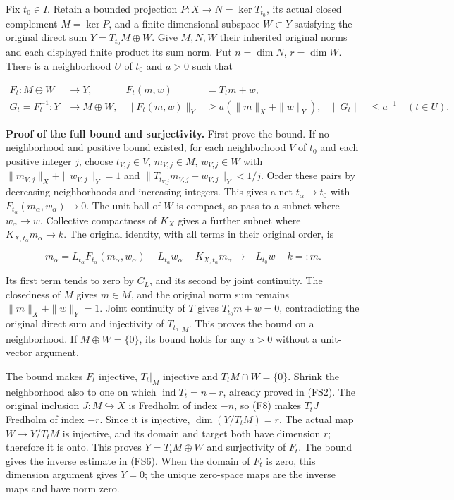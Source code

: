 \documentclass[
  11pt,
]{article}
\begin{document}
Fix \(t_0\in I\). Retain a bounded projection \(P:X\to N=\ker T_{t_0}\),
its actual closed complement \(M=\ker P\), and a finite-dimensional
subspace \(W\subset Y\) satisfying the original direct sum
\(Y=T_{t_0}M\oplus W\). Give \(M,N,W\) their inherited original norms
and each displayed finite product its sum norm. Put \(n=\dim N\),
\(r=\dim W\). There is a neighborhood \(U\) of \(t_0\) and \(a>0\) such
that

\[
 \begin{aligned}
 F_t:M\oplus W&\longrightarrow Y,& F_t(m,w)&=T_tm+w,\\
 G_t=F_t^{-1}:Y&\longrightarrow M\oplus W,&
 \|F_t(m,w)\|_Y&\geq a(\|m\|_X+\|w\|_Y),& \|G_t\|&\leq a^{-1}
 \quad(t\in U).
 \end{aligned}                                                \tag{FS6}
\]

\textbf{Proof of the full bound and surjectivity.} First prove the
bound. If no neighborhood and positive bound existed, for each
neighborhood \(V\) of \(t_0\) and each positive integer \(j\), choose
\(t_{V,j}\in V\), \(m_{V,j}\in M\), \(w_{V,j}\in W\) with
\(\|m_{V,j}\|_X+\|w_{V,j}\|_Y=1\) and
\(\|T_{t_{V,j}}m_{V,j}+w_{V,j}\|_Y<1/j\). Order these pairs by
decreasing neighborhoods and increasing integers. This gives a net
\(t_\alpha\to t_0\) with \(F_{t_\alpha}(m_\alpha,w_\alpha)\to0\). The
unit ball of \(W\) is compact, so pass to a subnet where
\(w_\alpha\to w\). Collective compactness of \(K_X\) gives a further
subnet where \(K_{X,t_\alpha}m_\alpha\to k\). The original identity,
with all terms in their original order, is

\[
 m_\alpha
 =L_{t_\alpha}F_{t_\alpha}(m_\alpha,w_\alpha)
       -L_{t_\alpha}w_\alpha-K_{X,t_\alpha}m_\alpha
 \longrightarrow -L_{t_0}w-k=:m.                             \tag{FS7}
\]

Its first term tends to zero by \(C_L\), and its second by joint
continuity. The closedness of \(M\) gives \(m\in M\), and the original
norm sum remains \(\|m\|_X+\|w\|_Y=1\). Joint continuity of \(T\) gives
\(T_{t_0}m+w=0\), contradicting the original direct sum and injectivity
of \(T_{t_0}|_M\). This proves the bound on a neighborhood. If
\(M\oplus W=\{0\}\), its bound holds for any \(a>0\) without a
unit-vector argument.

The bound makes \(F_t\) injective, \(T_t|_M\) injective and
\(T_tM\cap W=\{0\}\). Shrink the neighborhood also to one on which
\(\operatorname{ind}T_t=n-r\), already proved in (FS2). The original
inclusion \(J:M\hookrightarrow X\) is Fredholm of index \(-n\), so (F8)
makes \(T_tJ\) Fredholm of index \(-r\). Since it is injective,
\(\dim(Y/T_tM)=r\). The actual map \(W\to Y/T_tM\) is injective, and its
domain and target both have dimension \(r\); therefore it is onto. This
proves \(Y=T_tM\oplus W\) and surjectivity of \(F_t\). The bound gives
the inverse estimate in (FS6). When the domain of \(F_t\) is zero, this
dimension argument gives \(Y=0\); the unique zero-space maps are the
inverse maps and have norm zero.
\end{document}
